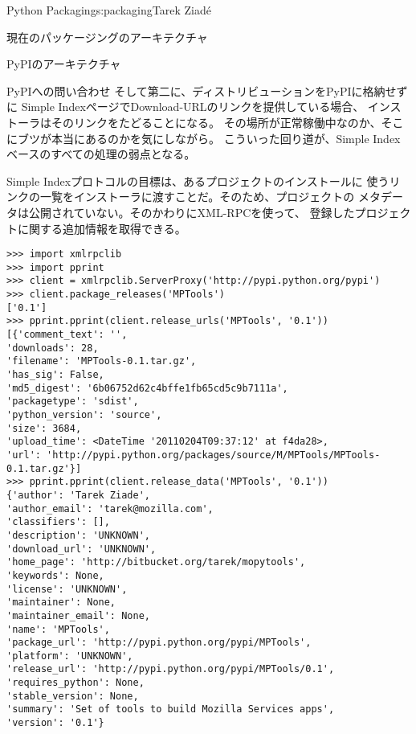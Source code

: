 \begin{aosachapter}{Python Packaging}{s:packaging}{Tarek Ziad\'{e}}
\begin{aosasect1}{現在のパッケージングのアーキテクチャ}
\begin{aosasect2}{PyPIのアーキテクチャ}
\begin{aosasect3}{PyPIへの問い合わせ}
そして第二に、ディストリビューションをPyPIに格納せずに
Simple IndexページでDownload-URLのリンクを提供している場合、
インストーラはそのリンクをたどることになる。
その場所が正常稼働中なのか、そこにブツが本当にあるのかを気にしながら。
こういった回り道が、Simple Indexベースのすべての処理の弱点となる。

Simple Indexプロトコルの目標は、あるプロジェクトのインストールに
使うリンクの一覧をインストーラに渡すことだ。そのため、プロジェクトの
メタデータは公開されていない。そのかわりにXML-RPCを使って、
登録したプロジェクトに関する追加情報を取得できる。

\begin{verbatim}
>>> import xmlrpclib
>>> import pprint
>>> client = xmlrpclib.ServerProxy('http://pypi.python.org/pypi')
>>> client.package_releases('MPTools')
['0.1']
>>> pprint.pprint(client.release_urls('MPTools', '0.1'))
[{'comment_text': '',
'downloads': 28,
'filename': 'MPTools-0.1.tar.gz',
'has_sig': False,
'md5_digest': '6b06752d62c4bffe1fb65cd5c9b7111a',
'packagetype': 'sdist',
'python_version': 'source',
'size': 3684,
'upload_time': <DateTime '20110204T09:37:12' at f4da28>,
'url': 'http://pypi.python.org/packages/source/M/MPTools/MPTools-0.1.tar.gz'}]
>>> pprint.pprint(client.release_data('MPTools', '0.1'))
{'author': 'Tarek Ziade',
'author_email': 'tarek@mozilla.com',
'classifiers': [],
'description': 'UNKNOWN',
'download_url': 'UNKNOWN',
'home_page': 'http://bitbucket.org/tarek/mopytools',
'keywords': None,
'license': 'UNKNOWN',
'maintainer': None,
'maintainer_email': None,
'name': 'MPTools',
'package_url': 'http://pypi.python.org/pypi/MPTools',
'platform': 'UNKNOWN',
'release_url': 'http://pypi.python.org/pypi/MPTools/0.1',
'requires_python': None,
'stable_version': None,
'summary': 'Set of tools to build Mozilla Services apps',
'version': '0.1'}
\end{verbatim}


\end{aosasect3}
\end{aosasect2}
\end{aosasect1}
\end{aosachapter}
